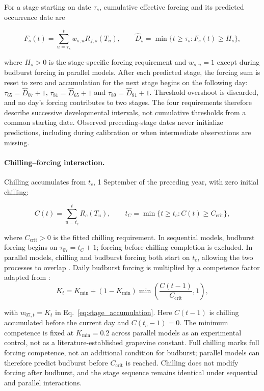 \documentclass[a4paper,11pt]{article}
\begin{document}
For a stage starting on date $\tau_s$, cumulative effective forcing and its predicted occurrence date are

\begin{equation}
F_s(t)=\sum_{u=\tau_s}^{t}w_{s,u}R_{f,s}(T_u),\qquad
\widehat{D}_s=\min\{t\geq\tau_s:F_s(t)\geq H_s\},
\label{eq:stage_accumulation}
\end{equation}

where $H_s>0$ is the stage-specific forcing requirement and $w_{s,u}=1$ except during budburst forcing in parallel models. After each predicted stage, the forcing sum is reset to zero and accumulation for the next stage begins on the following day: $\tau_{65}=\widehat{D}_{07}+1$, $\tau_{81}=\widehat{D}_{65}+1$ and $\tau_{89}=\widehat{D}_{81}+1$. Threshold overshoot is discarded, and no day's forcing contributes to two stages. The four requirements therefore describe successive developmental intervals, not cumulative thresholds from a common starting date. Observed preceding-stage dates never initialize predictions, including during calibration or when intermediate observations are missing.

\paragraph{Chilling--forcing interaction.}
Chilling accumulates from $t_c$, 1 September of the preceding year, with zero initial chilling:

\begin{equation}
C(t)=\sum_{u=t_c}^{t}R_c(T_u),\qquad
t_C=\min\{t\geq t_c:C(t)\geq C_{\mathrm{crit}}\},
\label{eq:chilling_accumulation}
\end{equation}

where $C_{\mathrm{crit}}>0$ is the fitted chilling requirement. In sequential models, budburst forcing begins on $\tau_{07}=t_C+1$; forcing before chilling completion is excluded. In parallel models, chilling and budburst forcing both start on $t_c$, allowing the two processes to overlap \citep{chuineUnifiedModelBudburst2000}. Daily budburst forcing is multiplied by a competence factor adapted from \citet{liuSimulatingOnsetSpring2018}:
\begin{equation}
K_t = K_{\min} + (1-K_{\min})\min\!\left(\frac{C(t-1)}{C_{\mathrm{crit}}},1\right),
\label{eq:parallel_competence}
\end{equation}

with $w_{07,t}=K_t$ in Eq.~\ref{eq:stage_accumulation}. Here $C(t-1)$ is chilling accumulated before the current day and $C(t_c-1)=0$. The minimum competence is fixed at $K_{\min}=0.2$ across parallel models as an experimental control, not as a literature-established grapevine constant. Full chilling marks full forcing competence, not an additional condition for budburst; parallel models can therefore predict budburst before $C_{\mathrm{crit}}$ is reached. Chilling does not modify forcing after budburst, and the stage sequence remains identical under sequential and parallel interactions.
\end{document}

